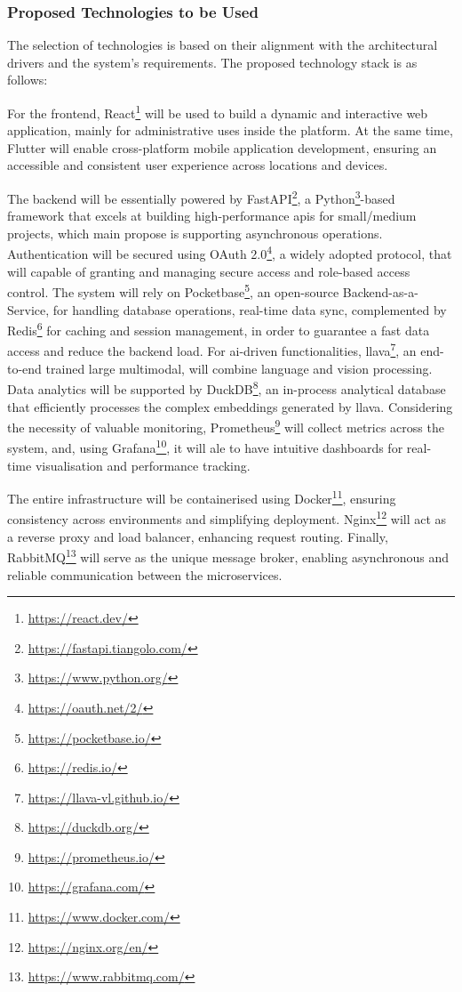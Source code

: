 
\subsubsection{Proposed Technologies to be Used}

The selection of technologies is based on their alignment with the architectural drivers and the system's requirements. The proposed technology stack is as follows:

For the frontend, React\footnote{\url{https://react.dev/}} will be used to build a dynamic and interactive web application, mainly for administrative uses inside the platform. At the same time, Flutter will enable cross-platform mobile application development, ensuring an accessible and consistent user experience across locations and devices.

The backend will be essentially powered by FastAPI\footnote{\url{https://fastapi.tiangolo.com/}}, a Python\footnote{\url{https://www.python.org/}}-based framework that excels at building high-performance \acp{api} for small/medium projects, which main propose is supporting asynchronous operations. Authentication will be secured using OAuth 2.0\footnote{\url{https://oauth.net/2/}}, a widely adopted protocol, that will capable of granting and managing secure access and role-based access control. The system will rely on Pocketbase\footnote{\url{https://pocketbase.io/}}, an open-source Backend-as-a-Service, for handling database operations, real-time data sync, complemented by Redis\footnote{\url{https://redis.io/}} for caching and session management, in order to guarantee a fast data access and reduce the backend load. For \ac{ai}-driven functionalities, \ac{llava}\footnote{\url{https://llava-vl.github.io/}}, an end-to-end trained large multimodal, will combine language and vision processing. Data analytics will be supported by DuckDB\footnote{\url{https://duckdb.org/}}, an in-process analytical database that efficiently processes the complex embeddings generated by \ac{llava}. Considering the necessity of valuable monitoring, Prometheus\footnote{\url{https://prometheus.io/}} will collect metrics across the system, and, using Grafana\footnote{\url{https://grafana.com/}}, it will ale to have intuitive dashboards for real-time visualisation and performance tracking. 

The entire infrastructure will be containerised using Docker\footnote{\url{https://www.docker.com/}}, ensuring consistency across environments and simplifying deployment. Nginx\footnote{\url{https://nginx.org/en/}} will act as a reverse proxy and load balancer, enhancing request routing. Finally, RabbitMQ\footnote{\url{https://www.rabbitmq.com/}} will serve as the unique message broker, enabling asynchronous and reliable communication between the microservices.


